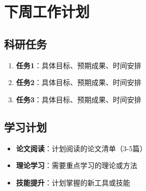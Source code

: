 \documentclass[12pt,a4paper]{article}
\begin{document}
\begin{comment}
\subsection{理论疑惑}
\begin{itemize}
    \item 理论理解上的困惑
    \item 需要进一步学习的知识点
    \item 希望得到指导的理论问题
\end{itemize}

\subsection{研究方向讨论}
\begin{itemize}
    \item 对研究方向的思考和疑问
    \item 需要与导师讨论的重要问题
    \item 对研究计划调整的想法
\end{itemize}

\end{comment}

\section{下周工作计划}

\subsection{科研任务}
\begin{enumerate}
    \item \textbf{任务1}：具体目标、预期成果、时间安排
    \item \textbf{任务2}：具体目标、预期成果、时间安排
    \item \textbf{任务3}：具体目标、预期成果、时间安排
\end{enumerate}

\subsection{学习计划}
\begin{itemize}
    \item \textbf{论文阅读}：计划阅读的论文清单（3-5篇）
    \item \textbf{理论学习}：需要重点学习的理论或方法
    \item \textbf{技能提升}：计划掌握的新工具或技能
\end{itemize}
\end{document}
